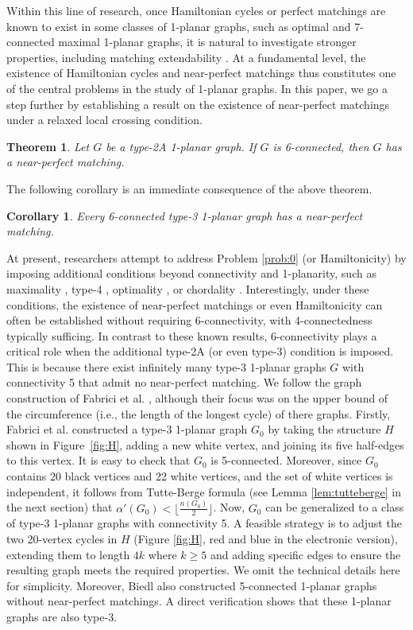 \documentclass[12pt,a4paper]{article}
\newtheorem{thm}{Theorem}[section]
\newtheorem{cor}{Corollary}
\begin{document}
Within this line of research, once  Hamiltonian cycles or perfect matchings are known to exist in some classes of 1-planar graphs, such as optimal and 7-connected maximal 1-planar graphs, it is natural to investigate stronger properties, including matching extendability \cite{MR3846896, MR4606109,MR4715705}.
At a fundamental level, the existence of Hamiltonian cycles and near-perfect matchings thus constitutes one of the central problems in the study of 1-planar graphs.
In this paper, we go a step further by establishing a result on the existence of near-perfect matchings under a relaxed local crossing condition.

\begin{thm}\label{thm:1}
Let $G$ be a type-2A 1-planar graph. If $G$ is 6-connected, then $G$ has a near-perfect matching.
\end{thm}

The following corollary is an immediate consequence of the above theorem.
\begin{cor}\label{cor:1}
Every 6-connected type-3 1-planar graph has a near-perfect matching.
\end{cor}

At present, researchers attempt to address Problem \ref{prob:0} (or Hamiltonicity) by imposing additional conditions beyond connectivity and 1-planarity, such as maximality \cite{Biedl}, type-4 \cite{MR4130388}, optimality \cite{MR2993519}, or chordality \cite{MR4933418}. Interestingly, under these conditions, the existence of near-perfect matchings or even Hamiltonicity can often be established without requiring 6-connectivity, with 4-connectedness typically sufficing. In contrast to these known results, 6-connectivity plays a critical role when the additional type-2A (or even type-3) condition is imposed. This is because there exist infinitely many type-3 1-planar graphs $G$ with connectivity 5 that admit no near-perfect matching. We follow the graph construction of Fabrici et al. \cite{MR4130388}, although their focus was on the upper bound of the circumference (i.e., the length of the longest cycle) of there graphs. Firstly, Fabrici et al. constructed a type-3 1-planar graph $G_0$ by taking the structure $H$ shown in Figure~\ref{fig:H}, adding a new white vertex, and joining its five half-edges to this vertex.  It is easy to check that $G_0$ is 5-connected.  Moreover, since $G_0$ contains 20 black vertices and 22 white vertices, and the set of white vertices is independent, it follows from Tutte-Berge  formula (see Lemma \ref{lem:tutteberge} in the next section) that $\alpha'(G_0)<\lfloor \frac{n(G_0)}{2}\rfloor$. Now, $G_0$ can be generalized to a class of type-3 1-planar graphs with connectivity 5. A feasible strategy is to adjust the two 20-vertex cycles in $H$ (Figure \ref{fig:H}, red and blue in the electronic version), extending them to length $4 k$ where $k\ge 5$ and adding specific edges to ensure the resulting graph meets the required properties.  We omit the technical details here for simplicity. Moreover, Biedl  \cite{Biedl}   also constructed 5-connected 1-planar graphs without near-perfect matchings. A direct verification shows that these 1-planar graphs are also type-3.
\end{document}
